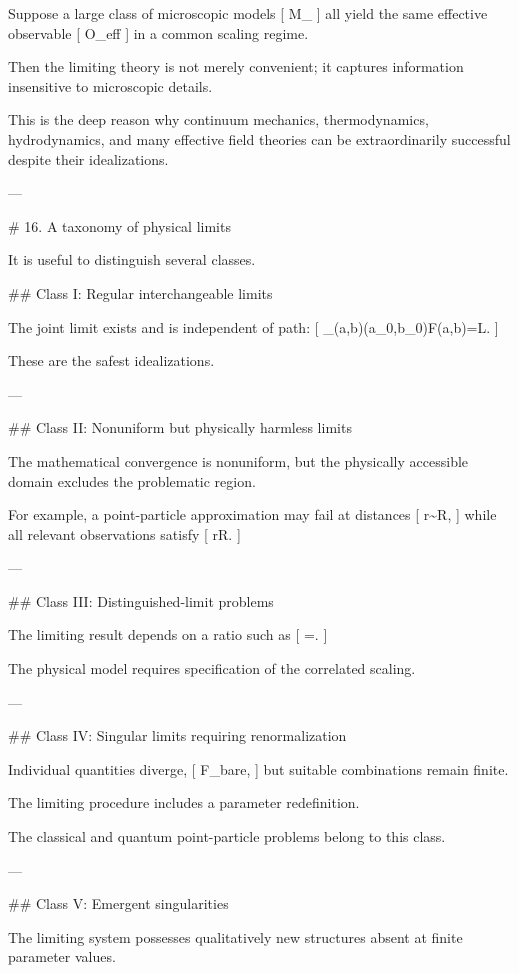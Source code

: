 Suppose a large class of microscopic models
[
M_\alpha
]
all yield the same effective observable
[
O_{\rm eff}
]
in a common scaling regime.

Then the limiting theory is not merely convenient; it captures information insensitive to microscopic details.

This is the deep reason why continuum mechanics, thermodynamics, hydrodynamics, and many effective field theories can be extraordinarily successful despite their idealizations.

---

# 16. A taxonomy of physical limits

It is useful to distinguish several classes.

## Class I: Regular interchangeable limits

The joint limit exists and is independent of path:
[
\lim_{(a,b)\to(a_0,b_0)}F(a,b)=L.
]

These are the safest idealizations.

---

## Class II: Nonuniform but physically harmless limits

The mathematical convergence is nonuniform, but the physically accessible domain excludes the problematic region.

For example, a point-particle approximation may fail at distances
[
r\sim R,
]
while all relevant observations satisfy
[
r\gg R.
]

---

## Class III: Distinguished-limit problems

The limiting result depends on a ratio such as
[
\lambda=.
]

The physical model requires specification of the correlated scaling.

---

## Class IV: Singular limits requiring renormalization

Individual quantities diverge,
[
F_{\rm bare}\rightarrow\infty,
]
but suitable combinations remain finite.

The limiting procedure includes a parameter redefinition.

The classical and quantum point-particle problems belong to this class.

---

## Class V: Emergent singularities

The limiting system possesses qualitatively new structures absent at finite parameter values.


